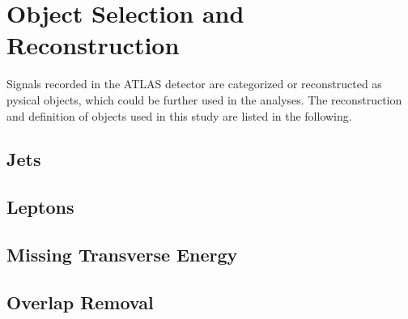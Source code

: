 \documentclass[class=NCU_thesis, crop=false]{standalone}
\begin{document}
\chapter{Object Selection and Reconstruction}
	Signals recorded in the ATLAS detector are categorized or reconstructed as pysical objects, which could be further used in the analyses. The reconstruction and definition of objects used in this study are listed in the following.
	
	\section{Jets}
	
	\section{Leptons}
	
	\section{Missing Transverse Energy}
	
	\section{Overlap Removal}
\end{document}
